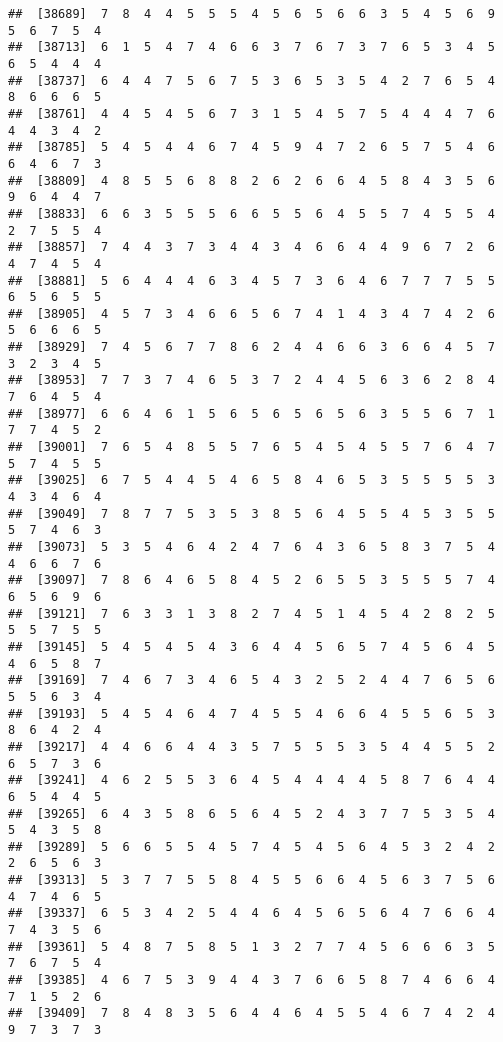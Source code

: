 \documentclass[
]{book}
\begin{document}
\begin{verbatim}
##  [38689]  7  8  4  4  5  5  5  4  5  6  5  6  6  3  5  4  5  6  9  5  6  7  5  4
##  [38713]  6  1  5  4  7  4  6  6  3  7  6  7  3  7  6  5  3  4  5  6  5  4  4  4
##  [38737]  6  4  4  7  5  6  7  5  3  6  5  3  5  4  2  7  6  5  4  8  6  6  6  5
##  [38761]  4  4  5  4  5  6  7  3  1  5  4  5  7  5  4  4  4  7  6  4  4  3  4  2
##  [38785]  5  4  5  4  4  6  7  4  5  9  4  7  2  6  5  7  5  4  6  6  4  6  7  3
##  [38809]  4  8  5  5  6  8  8  2  6  2  6  6  4  5  8  4  3  5  6  9  6  4  4  7
##  [38833]  6  6  3  5  5  5  6  6  5  5  6  4  5  5  7  4  5  5  4  2  7  5  5  4
##  [38857]  7  4  4  3  7  3  4  4  3  4  6  6  4  4  9  6  7  2  6  4  7  4  5  4
##  [38881]  5  6  4  4  4  6  3  4  5  7  3  6  4  6  7  7  7  5  5  6  5  6  5  5
##  [38905]  4  5  7  3  4  6  6  5  6  7  4  1  4  3  4  7  4  2  6  5  6  6  6  5
##  [38929]  7  4  5  6  7  7  8  6  2  4  4  6  6  3  6  6  4  5  7  3  2  3  4  5
##  [38953]  7  7  3  7  4  6  5  3  7  2  4  4  5  6  3  6  2  8  4  7  6  4  5  4
##  [38977]  6  6  4  6  1  5  6  5  6  5  6  5  6  3  5  5  6  7  1  7  7  4  5  2
##  [39001]  7  6  5  4  8  5  5  7  6  5  4  5  4  5  5  7  6  4  7  5  7  4  5  5
##  [39025]  6  7  5  4  4  5  4  6  5  8  4  6  5  3  5  5  5  5  3  4  3  4  6  4
##  [39049]  7  8  7  7  5  3  5  3  8  5  6  4  5  5  4  5  3  5  5  5  7  4  6  3
##  [39073]  5  3  5  4  6  4  2  4  7  6  4  3  6  5  8  3  7  5  4  4  6  6  7  6
##  [39097]  7  8  6  4  6  5  8  4  5  2  6  5  5  3  5  5  5  7  4  6  5  6  9  6
##  [39121]  7  6  3  3  1  3  8  2  7  4  5  1  4  5  4  2  8  2  5  5  5  7  5  5
##  [39145]  5  4  5  4  5  4  3  6  4  4  5  6  5  7  4  5  6  4  5  4  6  5  8  7
##  [39169]  7  4  6  7  3  4  6  5  4  3  2  5  2  4  4  7  6  5  6  5  5  6  3  4
##  [39193]  5  4  5  4  6  4  7  4  5  5  4  6  6  4  5  5  6  5  3  8  6  4  2  4
##  [39217]  4  4  6  6  4  4  3  5  7  5  5  5  3  5  4  4  5  5  2  6  5  7  3  6
##  [39241]  4  6  2  5  5  3  6  4  5  4  4  4  4  5  8  7  6  4  4  6  5  4  4  5
##  [39265]  6  4  3  5  8  6  5  6  4  5  2  4  3  7  7  5  3  5  4  5  4  3  5  8
##  [39289]  5  6  6  5  5  4  5  7  4  5  4  5  6  4  5  3  2  4  2  2  6  5  6  3
##  [39313]  5  3  7  7  5  5  8  4  5  5  6  6  4  5  6  3  7  5  6  4  7  4  6  5
##  [39337]  6  5  3  4  2  5  4  4  6  4  5  6  5  6  4  7  6  6  4  7  4  3  5  6
##  [39361]  5  4  8  7  5  8  5  1  3  2  7  7  4  5  6  6  6  3  5  7  6  7  5  4
##  [39385]  4  6  7  5  3  9  4  4  3  7  6  6  5  8  7  4  6  6  4  7  1  5  2  6
##  [39409]  7  8  4  8  3  5  6  4  4  6  4  5  5  4  6  7  4  2  4  9  7  3  7  3

\end{verbatim}
\end{document}
